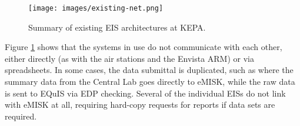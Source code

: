 %
\begin{figure}[!htpb]
\centering
\texttt{[image: images/existing-net.png]} 
\caption{Summary of existing EIS architectures at KEPA.}
\label{fig:existing}
\end{figure}
%

Figure \ref{fig:existing} shows that the systems in use do not communicate with each other, either directly (as with the air stations and the Envista ARM) or via spreadsheets. In some cases, the data submittal is duplicated, such as where the summary data from the Central Lab goes directly to eMISK, while the raw data is sent to EQuIS via EDP checking. Several of the individual EISs do not link with eMISK at all, requiring hard-copy requests for reports if data sets are required.